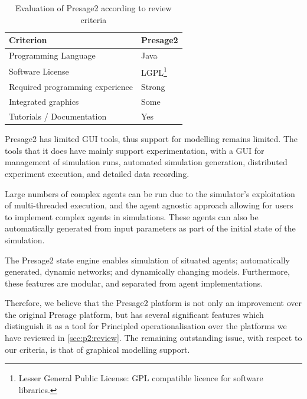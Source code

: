 \begin{table}[h]
\begin{minipage}{1\textwidth}
	\myfloatalign
	\caption{Evaluation of Presage2 according to review criteria}\label{tab:presagereview}
	\begin{tabularx}{\textwidth}{X|X}
	Criterion & Presage2 \\ \midrule
	Programming Language & Java \\
	Software License & LGPL\footnote{Lesser General Public License: \ac{GPL}
	compatible licence for software libraries.} \\
	Required programming experience & Strong \\
	Integrated graphics & Some \\
	Tutorials / Documentation & Yes \\
	\end{tabularx}
\end{minipage}
\end{table}

Presage2 has limited \ac{GUI} tools, thus support for modelling remains limited.
The tools that it does have mainly support experimentation, with a \ac{GUI} for
management of simulation runs, automated simulation generation, distributed
experiment execution, and detailed data recording.

Large numbers of complex agents can be run due to the simulator's exploitation
of multi-threaded execution, and the agent agnostic approach allowing for users
to implement complex agents in simulations. These agents can also be
automatically generated from input parameters as part of the initial state of
the simulation.

The Presage2 state engine enables simulation of situated agents;
automatically generated, dynamic networks; and dynamically changing models.
Furthermore, these features are modular, and separated from agent
implementations.

Therefore, we believe that the Presage2 platform is not only an improvement over
the original Presage platform, but has several significant features which
distinguish it as a tool for Principled operationalisation over the platforms we
have reviewed in \autoref{sec:p2:review}. The remaining outstanding issue, with
respect to our criteria, is that of graphical modelling support.

